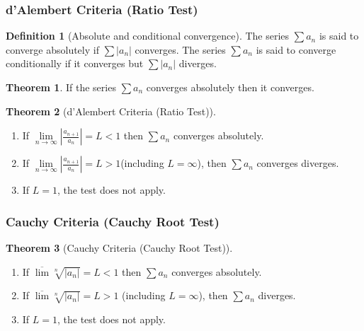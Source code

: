 \documentclass[fleqn, a4paper, 8pt, twoside]{amsart}
\theoremstyle{definition}
\theoremstyle{bluedefinition}
\newtheorem{definition}{Definition}
\theoremstyle{redtheorem}
\newtheorem{theorem}{Theorem}
\begin{document}
\begin{multicols}{2}
\begin{spacing}{0.7}
\subsubsection{d'Alembert Criteria (Ratio Test)}

\begin{definition}[Absolute and conditional convergence]
	The series $\sum a_n$ is said to converge absolutely if $\sum |a_n|$ converges.
	The series $\sum a_n$ is said to converge conditionally if it converges but $\sum |a_n|$ diverges.
\end{definition}

\begin{theorem}
	If the series $\sum a_n$ converges absolutely then it converges.
\end{theorem}

\begin{theorem}[d'Alembert Criteria (Ratio Test)]
	\begin{enumerate}
		\item 
			If $\lim\limits_{n \to \infty} \left| \frac{a_{n + 1}}{a_n} \right| = L < 1$ then $\sum a_n$ converges absolutely.
		\item 
			If $\lim\limits_{n \to \infty} \left| \frac{a_{n + 1}}{a_n} \right| = L > 1$(including $L = \infty$), then $\sum a_n$ converges diverges.
		\item
			If $L = 1$, the test does not apply.
	\end{enumerate}
	\label{d'Alembert Criteria (Ratio Test)}
\end{theorem}

\subsubsection{Cauchy Criteria (Cauchy Root Test)}

\begin{theorem}[Cauchy Criteria (Cauchy Root Test)]
	\begin{enumerate}
		\item
			If $\overline{\lim} \sqrt[n]{|a_n|} = L < 1$ then $\sum a_n$ converges absolutely.
		\item
			If $\overline{\lim} \sqrt[n]{|a_n|} = L > 1$ (including $L = \infty$), then $\sum a_n$ diverges.
		\item
			If $L = 1$, the test does not apply.
	\end{enumerate}
	\label{Cauchy Criteria (Cauchy Root Test)}
\end{theorem}


\end{spacing}
\end{multicols}
\end{document}
